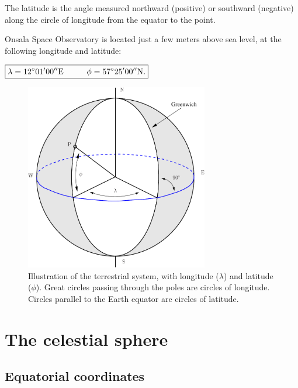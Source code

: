 The latitude is the angle measured northward (positive) or southward
(negative) along the circle of longitude from the equator to the
point.

Onsala Space Observatory is located just a few meters above sea level,
at the following longitude and latitude:

\begin{center}
${\bf{\boxed{\lambda=12^{\circ}01'00'' \text{E}
\hspace{1cm}\phi=57^{\circ}25'00''\text{N.} }}}$
\end{center}  

\begin{figure}[ht]
\begin{center}
\includegraphics[width=8cm]{../figures/longlat.pdf}
\end{center}
\caption{Illustration of the terrestrial system, with longitude
  ($\lambda$) and latitude ($\phi$).  Great circles passing through
  the poles are circles of longitude.  Circles parallel to the Earth
  equator are circles of latitude. }
\label{figearth}
\end{figure}


\section{The celestial sphere}

\subsection{Equatorial coordinates}

